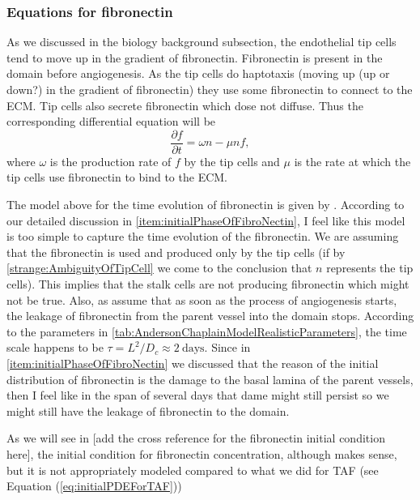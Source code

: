 \subsubsection{Equations for fibronectin}
As we discussed in the biology background subsection, the endothelial tip cells tend to move up in the gradient of fibronectin. Fibronectin is present in the domain before angiogenesis. As the tip cells do haptotaxis (moving up {\color{red} (up or down?)} in the gradient of fibronectin) they use some fibronectin to connect to the ECM. Tip cells also secrete fibronectin which dose not diffuse. Thus the corresponding differential equation will be 
\[ \frac{\partial f}{\partial t} = \omega n - \mu n f, \]
where $ \omega $ is the production rate of $ f $ by the tip cells and $ \mu $ is the rate at which the tip cells use fibronectin to bind to the ECM.

\begin{strangeObs}
	The model above for the time evolution of fibronectin is given by \cite{Anderson1998}. According to our detailed discussion in \autoref{item:initialPhaseOfFibroNectin}, I feel like this model is too simple to capture the time evolution of the fibronectin. We are assuming that the fibronectin is used and produced only by the tip cells (if by \autoref{strange:AmbiguityOfTipCell} we come to the conclusion that $ n $ represents the tip cells). This implies that the stalk cells are not producing fibronectin which might not be true. Also, as assume that as soon as the process of angiogenesis starts, the leakage of fibronectin from the parent vessel into the domain stops. According to the parameters in \autoref{tab:AndersonChaplainModelRealisticParameters}, the time scale happens to be $ \tau = L^2/D_c \approx 2\ \text{days}  $. Since in \autoref{item:initialPhaseOfFibroNectin} we discussed that the reason of the initial distribution of fibronectin is the damage to the basal lamina of the parent vessels, then I feel like in the span of several days that dame might still persist so we might still have the leakage of fibronectin to the domain.
\end{strangeObs}

\begin{strangeObs}
	\label{strange:FibronectinInitialConcentration}
	As we will see in {\color{red} [add the cross reference for the fibronectin initial condition here]}, the initial condition for fibronectin concentration, although makes sense, but it is not appropriately modeled compared to what we did for TAF (see Equation (\autoref{eq:initialPDEForTAF}))
\end{strangeObs}

